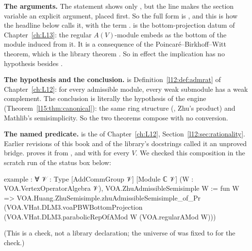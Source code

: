 \begin{dictionary}
\textbf{The arguments.} The statement shows only , but the line  makes the section variable
 an explicit argument, placed first. So the full form is
\allowbreak{}\allowbreak{}, and this is how the headline below calls it, with
 the term  .  is the bottom-projection datum of
Chapter~\ref{ch:L13}: the regular $A(V)$-module embeds as the bottom of the module induced from it. It is a consequence of
the Poincar\'e--Birkhoff--Witt theorem, which is the library theorem . So in effect the implication has no
hypothesis besides .

\textbf{The hypothesis and the conclusion.}  is Definition~\ref{l12:def:admrat} of
Chapter~\ref{ch:L12}: for every admissible module, every weak submodule has a weak complement. The conclusion
 is literally the hypothesis  of the engine
(Theorem~\ref{l15:thm:canonical}): the same ring structure (, Zhu's product) and Mathlib's semisimplicity.
So the two theorems compose with no conversion.

\textbf{The named predicate.}  is the 
 of Chapter~\ref{ch:L12}, Section~\ref{l12:sec:rationality}.
Earlier revisions of this book and of the library's docstrings called it an unproved bridge. 
proves it from , and with  for every $V$. We checked this composition in the
scratch run of the status box below:
\begin{plaincode}
example : ∀ {𝒱 : Type} [AddCommGroup 𝒱] [Module ℂ 𝒱] (W : VOA.VertexOperatorAlgebra 𝒱),
    VOA.ZhuAdmissibleSemisimple W :=
  fun W => VOA.Huang.ZhuSemisimple.zhuAdmissibleSemisimple_of_Pr
    (VOA.VHat.DLM3.voaPBWBottomProjection
      (VOA.VHat.DLM3.parabolicRepOfAMod W (VOA.regularAMod W)))
\end{plaincode}
(This is a check, not a library declaration; the universe of  was fixed to  for the check.)


\end{dictionary}
